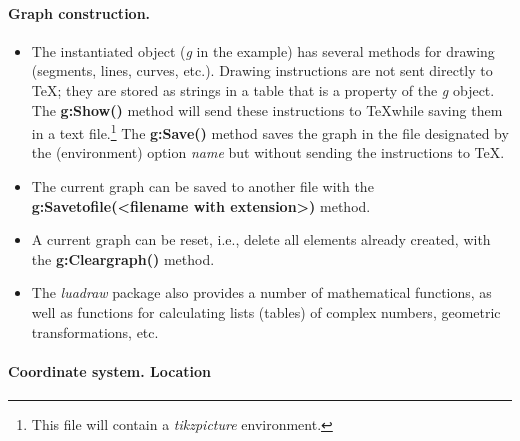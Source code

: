 \paragraph{Graph construction.}

\begin{itemize}
\item The instantiated object (\emph{g} in the example) has several methods for drawing (segments, lines, curves, etc.). Drawing instructions are not sent directly to \TeX; they are stored as strings in a table that is a property of the \emph{g} object. The \textbf{g:Show()} method will send these instructions to \TeX while saving them in a text file.\footnote{This file will contain a \emph{tikzpicture} environment.} The \textbf{g:Save()} method saves the graph in the file designated by the (environment) option \emph{name} but without sending the instructions to \TeX.
\item The current graph can be saved to another file with the \textbf{g:Savetofile(<filename with extension>)} method.
\item A current graph can be reset, i.e., delete all elements already created, with the \textbf{g:Cleargraph()} method.
\item The \emph{luadraw} package also provides a number of mathematical functions, as well as functions for calculating lists (tables) of complex numbers, geometric transformations, etc.
\end{itemize}

\paragraph{Coordinate system. Location}

